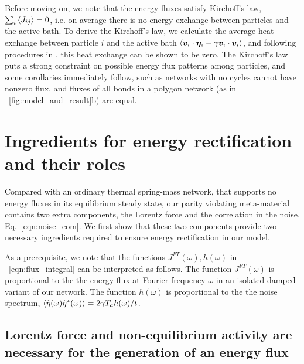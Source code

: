 \documentclass[
 preprint,
 preprintnumbers,
 amsmath,amssymb,
 aps,
 pre,
 longbibliography,
 superscriptaddress,
 10pt, twocolumn
]{revtex4-1}
\begin{document}
Before moving on, we note that the energy fluxes satisfy Kirchoff's law, $\sum_i \expval{J_{ij}} = 0$, i.e. on average there is no energy exchange between particles and the active bath. To derive the Kirchoff's law, we calculate the average heat exchange between particle $i$ and the active bath $\expval{\bm{v}_i \cdot \bm{\eta}_i - \gamma \bm{v}_i \cdot \bm{v}_i}$, and following procedures in \cite{Kundu2011LargeDeviations}, this heat exchange can be shown to be zero.
The Kirchoff's law puts a strong constraint on possible energy flux patterns among particles, and some corollaries immediately follow, such as networks with no cycles cannot have nonzero flux, and fluxes of all bonds in a polygon network (as in \figurename~\ref{fig:model_and_result}b) are equal.


\section{Ingredients for energy rectification and their roles} \label{sec:fourier}

Compared with an ordinary thermal spring-mass network, that supports no energy fluxes in its equilibrium steady state, our parity violating meta-material contains two extra components, the Lorentz force and the correlation in the noise, Eq.~\ref{eqn:noise_eom}.
We first show that these two components provide two necessary ingredients required to ensure energy rectification in our model.

As a prerequisite, we note that the functions $J^{FT}(\omega), h(\omega)$ in \eqnname~\eqref{eqn:flux_integral} can be interpreted as follows.
The function $J^{FT}(\omega)$ is proportional to the the energy flux at Fourier frequency $\omega$ in an isolated damped variant of our network.
The function $h(\omega)$ is proportional to the the noise spectrum, $\expval{\tilde{\eta}(\omega)\tilde{\eta}^*(\omega)} = 2\gamma T_a h(\omega) / t$.


\subsection{Lorentz force and non-equilibrium activity are necessary for the generation of an energy flux} 
\end{document}
